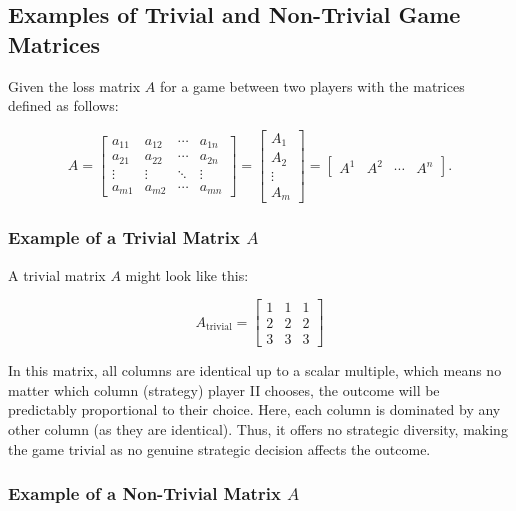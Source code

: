 \documentclass[11pt]{article}
\theoremstyle{boldStyle}
\begin{document}
\subsection{Examples of Trivial and Non-Trivial Game Matrices}

Given the loss matrix \( A \) for a game between two players with the matrices defined as follows:

\begin{equation} \label{eq:3}
    A = \begin{bmatrix}
    a_{11} & a_{12} & \cdots & a_{1n} \\
    a_{21} & a_{22} & \cdots & a_{2n} \\
    \vdots & \vdots & \ddots & \vdots \\
    a_{m1} & a_{m2} & \cdots & a_{mn}
    \end{bmatrix} = \begin{bmatrix} A_1 \\ A_2 \\ \vdots \\ A_m \end{bmatrix} = \begin{bmatrix} A^1 & A^2 & \cdots & A^n \end{bmatrix}.
\end{equation}

\subsubsection{Example of a Trivial Matrix \( A \)}

A trivial matrix \( A \) might look like this:

\begin{equation} \label{eq:trivial}
    A_{\text{trivial}} = \begin{bmatrix}
    1 & 1 & 1 \\
    2 & 2 & 2 \\
    3 & 3 & 3
    \end{bmatrix}
\end{equation}

In this matrix, all columns are identical up to a scalar multiple, which means no matter which column (strategy) player II chooses, the outcome will be predictably proportional to their choice. Here, each column is dominated by any other column (as they are identical). Thus, it offers no strategic diversity, making the game trivial as no genuine strategic decision affects the outcome.

\subsubsection{Example of a Non-Trivial Matrix \( A \)}
\end{document}
